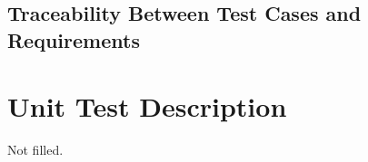 \documentclass[12pt, titlepage]{article}
\begin{document}
\subsection{Traceability Between Test Cases and Requirements}


\section{Unit Test Description}

Not filled.







\end{document}
